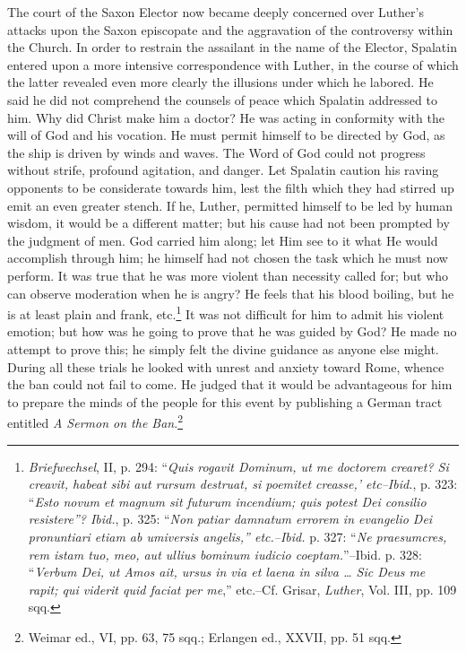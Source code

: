 The court of the Saxon Elector now became deeply concerned over
Luther’s attacks upon the Saxon episcopate and the aggravation of
the controversy within the Church. In order to restrain the assailant
in the name of the Elector, Spalatin entered upon a more intensive
correspondence with Luther, in the course of which the latter revealed
even more clearly the illusions under which he labored. He said
he did not comprehend the counsels of peace which Spalatin addressed to
him. Why did Christ make him a doctor? He was acting in
conformity with the will of God and his vocation. He must permit
himself to be directed by God, as the ship is driven by winds and
waves. The Word of God could not progress without strife, profound
agitation, and danger. Let Spalatin caution his raving opponents to
be considerate towards him, lest the filth which they had stirred up
emit an even greater stench. If he, Luther, permitted himself to be
led by human wisdom, it would be a different matter; but his cause
had not been prompted by the judgment of men. God carried him
along; let Him see to it what He would accomplish through him;
he himself had not chosen the task which he must now perform.
It was true that he was more violent than necessity called for; but
who can observe moderation when he is angry? He feels that his
blood boiling, but he is at least plain and frank, etc.\footnote
{\textit{Briefwechsel}, II, p. 294: “\textit{Quis rogavit Dominum, ut me doctorem crearet? Si creavit,
habeat sibi aut rursum destruat, si poemitet creasse,’ etc--Ibid.}, p. 323: ``\textit{Esto novum
et magnum sit futurum incendium; quis potest Dei consilio resistere”? Ibid.}, p. 325:
“\textit{Non patiar damnatum errorem in evangelio Dei pronuntiari etiam ab umiversis angelis,”
etc.--Ibid.} p. 327: “\textit{Ne praesumcres, rem istam tuo, meo, aut ullius bominum iudicio
coeptam.}”--Ibid. p. 328: “\textit{Verbum Dei, ut Amos ait, ursus in via et laena in silva \dots
Sic Deus me rapit; qui viderit quid faciat per me},” etc.--Cf. Grisar, \textit{Luther}, Vol. III, pp.
109 sqq.}
It was not
difficult for him to admit his violent emotion; but how was he going
to prove that he was guided by God? He made no attempt to prove
this; he simply felt the divine guidance as anyone else might.
During all these trials he looked with unrest and anxiety toward
Rome, whence the ban could not fail to come.
He judged that it would be advantageous for him to prepare the
minds of the people for this event by publishing a German tract
entitled \textit{A Sermon on the Ban}.\footnote
{Weimar ed., VI, pp. 63, 75 sqq.; Erlangen ed., XXVII, pp. 51 sqq.}
